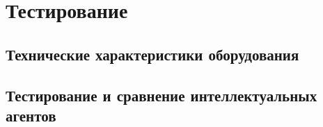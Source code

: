\documentclass{vsureport}
\begin{document}
\section{Тестирование}


\subsection{Технические характеристики оборудования}


\subsection{Тестирование и сравнение интеллектуальных агентов}




\printbibliography
\end{document}
